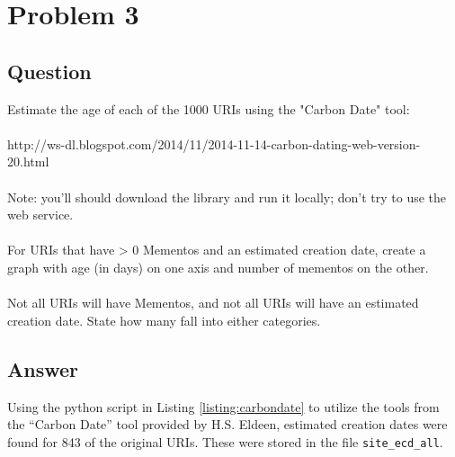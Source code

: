 \section{Problem 3}

\subsection{Question}
\vspace*{10pt}
Estimate the age of each of the 1000 URIs using the "Carbon Date" tool:\\
\\
http://ws-dl.blogspot.com/2014/11/2014-11-14-carbon-dating-web-version-20.html\\
\\
Note: you'll should download the library and run it locally; don't
try to use the web service.\\
\\
For URIs that have > 0 Mementos and an estimated creation date,
create a graph with age (in days) on one axis and number of mementos
on the other.  \\
\\
Not all URIs will have Mementos, and not all URIs will have an estimated creation date.  State how many fall into either categories. 

\subsection{Answer}
\vspace{2mm}
Using the python script in Listing \ref{listing:carbondate} to utilize the tools from the 
``Carbon Date'' tool provided by H.S. Eldeen, estimated creation dates were found for
843 of the original URIs. These were stored in the file {\tt site\_ecd\_all}.

